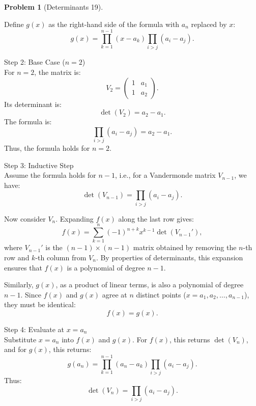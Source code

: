 \documentclass[12pt]{article}
\theoremstyle{definition}
\newtheorem{problem}{Problem}
\begin{document}
\begin{problem}[Determinants 19]
\begin{solution}
        Define \( g(x) \) as the right-hand side of the formula with \( a_n \) replaced by \( x \):
        \[
        g(x) = \prod_{k=1}^{n-1} (x - a_k) \prod_{i > j} (a_i - a_j).
        \]

        Step 2: Base Case (\( n = 2 \))\\
        For \( n = 2 \), the matrix is:
        \[
        V_2 =
        \begin{pmatrix}
        1 & a_1 \\
        1 & a_2
        \end{pmatrix}.
        \]
        Its determinant is:
        \[
        \det(V_2) = a_2 - a_1.
        \]
        The formula is:
        \[
        \prod_{i > j} (a_i - a_j) = a_2 - a_1.
        \]
        Thus, the formula holds for \( n = 2 \).

        Step 3: Inductive Step\\
        Assume the formula holds for \( n-1 \), i.e., for a Vandermonde matrix \( V_{n-1} \), we have:
        \[
        \det(V_{n-1}) = \prod_{i > j} (a_i - a_j).
        \]

        Now consider \( V_n \). Expanding \( f(x) \) along the last row gives:
        \[
        f(x) = \sum_{k=1}^n (-1)^{n+k} x^{k-1} \det(V_{n-1}'),
        \]
        where \( V_{n-1}' \) is the \((n-1) \times (n-1)\) matrix obtained by removing the \( n \)-th row and \( k \)-th column from \( V_n \). By properties of determinants, this expansion ensures that \( f(x) \) is a polynomial of degree \( n-1 \).

        Similarly, \( g(x) \), as a product of linear terms, is also a polynomial of degree \( n-1 \). Since \( f(x) \) and \( g(x) \) agree at \( n \) distinct points (\( x = a_1, a_2, \ldots, a_{n-1} \)), they must be identical:
        \[
        f(x) = g(x).
        \]

        Step 4: Evaluate at \( x = a_n \)\\
        Substitute \( x = a_n \) into \( f(x) \) and \( g(x) \). For \( f(x) \), this returns \( \det(V_n) \), and for \( g(x) \), this returns:
        \[
        g(a_n) = \prod_{k=1}^{n-1} (a_n - a_k) \prod_{i > j} (a_i - a_j).
        \]
        Thus:
        \[
        \det(V_n) = \prod_{i > j} (a_i - a_j).
        \]

    \end{solution}
\end{problem}
\end{document}
